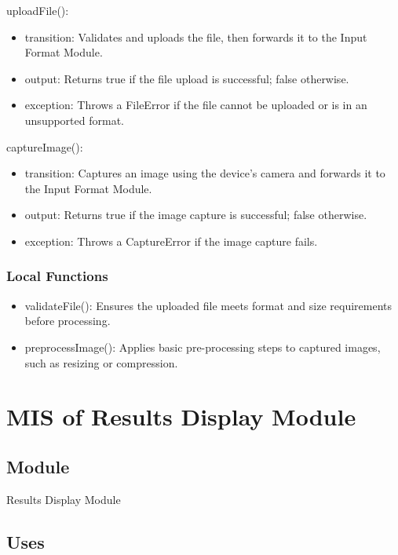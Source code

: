 \documentclass[12pt, titlepage]{article}
\begin{document}
\noindent uploadFile():
\begin{itemize}
    \item transition: Validates and uploads the file, then forwards it to the Input Format Module.
    \item output: Returns true if the file upload is successful; false otherwise.
    \item exception: Throws a FileError if the file cannot be uploaded or is in an unsupported format.
\end{itemize}

\noindent captureImage():
\begin{itemize}
    \item transition: Captures an image using the device's camera and forwards it to the Input Format Module.
    \item output: Returns true if the image capture is successful; false otherwise.
    \item exception: Throws a CaptureError if the image capture fails.
\end{itemize}

\subsubsection{Local Functions}

\begin{itemize}
    \item validateFile(): Ensures the uploaded file meets format and size requirements before processing.
    \item preprocessImage(): Applies basic pre-processing steps to captured images, such as resizing or compression.
\end{itemize}

\newpage


\section{MIS of Results Display Module}\label{results_display_module}

\subsection{Module}

Results Display Module

\subsection{Uses}
\end{document}
